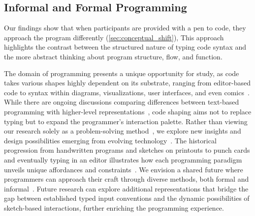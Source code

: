 \subsection{Informal and Formal Programming}
Our findings show that when participants are provided with a pen to code, they approach the program differently (\autoref{sec:conceptual_shift}), 
This approach highlights the contrast between the structured nature of typing code syntax and the more abstract thinking about program structure, flow, and function.

The domain of programming presents a unique opportunity for study, as code takes various shapes highly dependent on its substrate, ranging from editor-based code to syntax within diagrams, visualizations, user interfaces, and even comics~\cite{10.1145/3526113.3545617}.
While there are ongoing discussions comparing differences between text-based programming with higher-level representations~\cite{10.1145/3399715.3399821, noone2018visual}, code shaping aims not to replace typing but to expand the programmer's interaction palette. 
Rather than viewing our research solely as a problem-solving method~\cite{10.1145/3025453.3025765}, we explore new insights and design possibilities emerging from evolving technology~\cite{10.1145/3468505}.
The historical progression from handwritten programs and sketches on printouts to punch cards and eventually typing in an editor illustrates how each programming paradigm unveils unique affordances and constraints~\cite{arawjo_write_2020}. We envision a shared future where programmers can approach their craft through diverse methods, both formal and informal~\cite{pollock2024designing}.
Future research can explore additional representations that bridge the gap between established typed input conventions and the dynamic possibilities of sketch-based interactions, further enriching the programming experience.